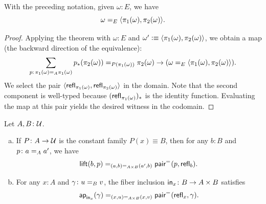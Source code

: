 \begin{cor}\label{cor:Sigma-uniqueness}
    With the preceding notation, given\/ $\omega\colon E$, we have
    \[
        \omega\mathrel{=_{E}}\langle\pi_1(\omega),\pi_2(\omega)\rangle.
    \]
\end{cor}

\begin{proof}
    Applying the theorem with $\omega\colon E$ and $\omega'\mathrel{\vcentcolon}\equiv\langle\pi_1(\omega),\pi_2(\omega)\rangle$, we obtain a map (the backward direction of the equivalence):
    \[
        \sum_{p\colon\pi_1(\omega)\eq A\pi_1(\omega)}
        p_*(\pi_2(\omega))\eq{P(\pi_1(\omega))}\pi_2(\omega)
        \to
        (\omega\eq E\dep{\pi_1(\omega),\pi_2(\omega)}).
    \]
    We select the pair $\langle\mathsf{refl}_{\pi_1(\omega)},\mathsf{refl}_{\pi_2(\omega)}\rangle$ in the domain. Note that the second component is well-typed because $(\mathsf{refl}_{\pi_1(\omega)})_*$ is the identity function. Evaluating the map at this pair yields the desired witness in the codomain.
\end{proof}

\begin{prop}\label{prop:lift-pair}
    Let\/ $A, B\colon\univ$.
    \begin{enumerate}[a),font=\upshape]
        \item If\/ $P\colon A\to\univ$ is the constant family\/ $P(x)\equiv B$, then for any\/ $b\colon B$ and\/ $p\colon a\eq A a'$, we have
        \[
            \mathsf{lift}(b,p) \mathrel{=_{(a,b)\mathrel{=_{A\times B}}(a',b)}} \mathsf{pair}^{\mathrel{=_{}}}(p,\mathsf{refl}_b).
        \]
        \item For any\/ $x\colon A$ and\/ $\gamma\colon u\eq B v$, the fiber inclusion\/ $\fun{in}_x\colon B\to A\times B$ satisfies
        \[
            \mathsf{ap}_{\mathsf{in}_x}(\gamma) \mathrel{=_{(x,u)\mathrel{=_{A\times B}}(x,v)}}\mathsf{pair}^{\mathrel{=_{}}}(\mathsf{refl}_x, \gamma).
        \]
    \end{enumerate}
\end{prop}

